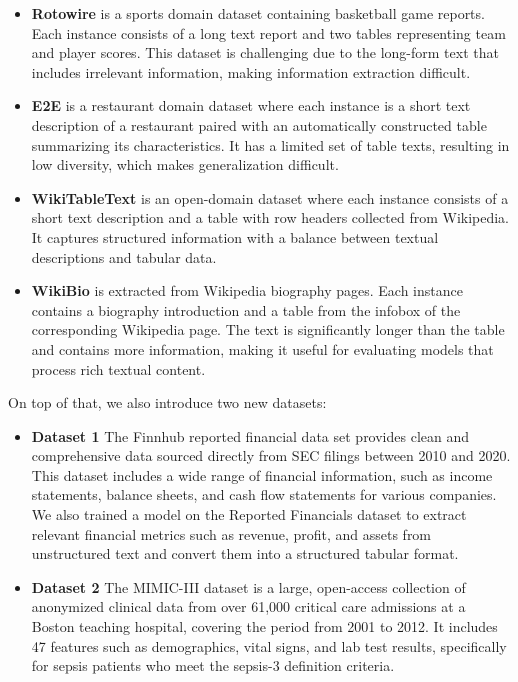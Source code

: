 \documentclass[12pt,a4paper]{article}
\begin{document}
\begin{itemize}

\item{\textbf{Rotowire}} is a sports domain dataset containing basketball game reports. Each instance consists of a long text report and two tables representing team and player scores. This dataset is challenging due to the long-form text that includes irrelevant information, making information extraction difficult.

\item{\textbf{E2E}} is a restaurant domain dataset where each instance is a short text description of a restaurant paired with an automatically constructed table summarizing its characteristics. It has a limited set of table texts, resulting in low diversity, which makes generalization difficult.

\item{\textbf{WikiTableText}} is an open-domain dataset where each instance consists of a short text description and a table with row headers collected from Wikipedia. It captures structured information with a balance between textual descriptions and tabular data.

\item{\textbf{WikiBio}} is extracted from Wikipedia biography pages. Each instance contains a biography introduction and a table from the infobox of the corresponding Wikipedia page. The text is significantly longer than the table and contains more information, making it useful for evaluating models that process rich textual content.
\end{itemize}
On top of that, we also introduce two new datasets:
\begin{itemize}
\item{\textbf{Dataset 1}} The Finnhub reported financial data set provides clean and comprehensive data sourced directly from SEC filings between 2010 and 2020. This dataset includes a wide range of financial information, such as income statements, balance sheets, and cash flow statements for various companies. 
We also trained a model on the Reported Financials dataset to extract relevant financial metrics such as revenue, profit, and assets from unstructured text and convert them into a structured tabular format. 
\item{\textbf{Dataset 2}} The MIMIC-III dataset is a large, open-access collection of anonymized clinical data from over 61,000 critical care admissions at a Boston teaching hospital, covering the period from 2001 to 2012. It includes 47 features such as demographics, vital signs, and lab test results, specifically for sepsis patients who meet the sepsis-3 definition criteria.
\end{itemize}
\end{document}
